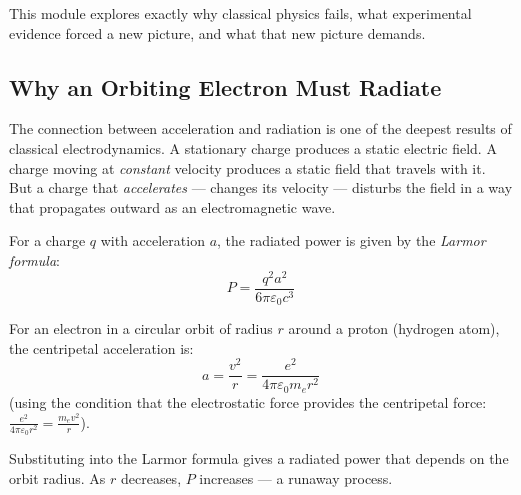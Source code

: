 \documentclass[12pt, a4paper]{book}
\newcommand{\newterm}[1]{\textit{\textcolor{DiscoveryColor}{#1}}}
\begin{document}
This module explores exactly why classical physics fails,
what experimental evidence forced a new picture,
and what that new picture demands.

\subsection{Why an Orbiting Electron Must Radiate}

The connection between acceleration and radiation
is one of the deepest results of classical electrodynamics.
A stationary charge produces a static electric field.
A charge moving at \emph{constant} velocity produces
a static field that travels with it.
But a charge that \emph{accelerates} --- changes its velocity ---
disturbs the field in a way that propagates outward as
an electromagnetic wave.

For a charge $q$ with acceleration $a$,
the radiated power is given by the \newterm{Larmor formula}:
\[
  P = \frac{q^2 a^2}{6\pi\varepsilon_0 c^3}
\]

For an electron in a circular orbit of radius $r$
around a proton (hydrogen atom), the centripetal
acceleration is:
\[
  a = \frac{v^2}{r} = \frac{e^2}{4\pi\varepsilon_0 m_e r^2}
\]
(using the condition that the electrostatic force provides
the centripetal force: $\frac{e^2}{4\pi\varepsilon_0 r^2} = \frac{m_e v^2}{r}$).

Substituting into the Larmor formula gives a radiated power
that depends on the orbit radius.
As $r$ decreases, $P$ increases --- a runaway process.
\end{document}
